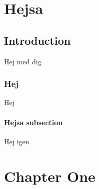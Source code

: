 \documentclass[paper=a4, fontsize=12pt, twoside, openright, titlepage=firstiscover, chapterprefix=true, headings=twolinechapter, headings=big, DIV=10]{scrbook}
\begin{document}





\setcounter{page}{1} %








\tableofcontents






\chapter{Hejsa}
\section{Introduction}
Hej med dig
\newpage
\subsection{Hej}
Hej
\newpage
\subsubsection{Hejsa subsection}
Hej igen



\chapter{Chapter One}
\lipsum
\end{document}
